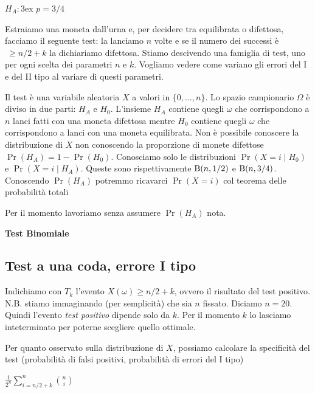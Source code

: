 \documentclass[11pt,openany]{book}
\begin{document}
$H_A:$\kern3ex $p=3/4$
 
Estraiamo una moneta dall'urna e, per decidere tra equilibrata o difettosa, facciamo il seguente test: la lanciamo $n$ volte e se il numero dei successi è $\ \ge n/2 + k$ la dichiariamo difettosa.
Stiamo descivendo una famiglia di test, uno per ogni scelta dei parametri $n$ e $k$. 
Vogliamo vedere come variano gli errori del I e del II tipo al variare di questi parametri. 

Il test è una variabile aleatoria $X$ a valori in $\{0,\dots,n\}$.
Lo spazio campionario $\Omega$ è diviso in due parti: $H_A$ e $H_0$.  L'insieme $H_A$ contiene quegli $\omega$ che corrispondono a $n$ lanci fatti con una moneta difettosa mentre $H_0$ contiene quegli $\omega$ che corrispondono a lanci con una moneta equilibrata.
Non è possibile conoscere la distribuzione di $X$ non conoscendo la proporzione di monete difettose $\Pr(H_A)=1-\Pr(H_0)$.
Conosciamo solo le distribuzioni $\Pr(X{=}i\mathbin|H_0)$ e  $\Pr(X{=}i\mathbin|H_A)$.
Queste sono rispettivamente ${\rm B}(n,1/2)$ e  ${\rm B}(n,3/4)$.
Conoscendo $\Pr(H_A)$ potremmo ricavarci $\Pr(X=i)$ col teorema delle probabilità totali


Per il momento lavoriamo senza assumere $\Pr(H_A)$ nota.


\clearpage\hfill\textbf{Test Binomiale}\subsection{Test a una coda, errore I tipo}

Indichiamo con $T_k$ l'evento $X(\omega)\ge n/2+k$, ovvero il risultato del test positivo. 
N.B. stiamo immaginando (per semplicità) che sia $n$ fissato.  
Diciamo $n=20$. 
Quindi l'evento \textit{test positivo} dipende solo da $k$.
Per il momento $k$ lo lasciamo inteterminato per poterne scegliere quello ottimale.

Per quanto osservato sulla distribuzione di $X$, possiamo calcolare la specificità del test (probabilità di falsi positivi, probabilità di errori del I tipo)



\medrel{=}$\displaystyle\frac1{2^n}\sum^n_{i=n/2+k} {n\choose i}$
\end{document}
